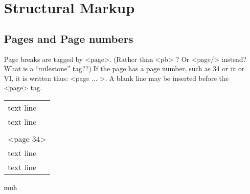 


 
\section{Structural Markup}

\subsection{Pages and Page numbers}

\begin{mainrule}
Page breaks are tagged by <page>. (Rather than <pb> ? Or <page/> instead? What is a “milestone” tag??) If the page has a page number, such as 34 or iii or VI, it is written thus: <page ... >. A blank line may be inserted before the <page> tag. 
\end{mainrule}

\begin{example}

\begin{type}
\begin{tabular}{l}
text line \\
text line \\
\\
<page 34> \\
text line \\
text line 
\end{tabular}
\end{type}

muh

\end{example}

